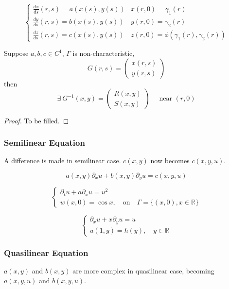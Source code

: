 $$
\left\{\begin{array}{ll}{\frac{d x}{d s}(r,s)=a(x(s), y(s))}& x(r,0)=\gamma_1(r) \\
{\frac{d y}{d s}(r,s)=b(x(s), y(s))} & y(r,0)=\gamma_2(r) \\
{\frac{d z}{d s}(r,s)=c(x(s), y(s))} & z(r,0)=\phi(\gamma_1(r), \gamma_2(r)) \end{array}\right.
$$
\begin{lemma}
Suppose $a, b, c \in C^{1}$, $\Gamma$ is non-characteristic, 
$$
G(r, s)=\left(\begin{array}{l}{x(r, s)} \\ {y(r, s)}\end{array}\right)
$$
then
$$
\exists\ G^{-1}(x, y)=\left(\begin{array}{l}{R(x, y)} \\ {S(x, y)}\end{array}\right) \quad \text { near }(r, 0)
$$
\end{lemma}
\begin{proof}
To be filled.
\end{proof}
\subsubsection{Semilinear Equation}
A difference is made in semilinear case. $c(x,y)$ now becomes $c(x,y,u)$.

\begin{equation}
a(x, y) \partial_{x} u+b(x, y) \partial_y u=c(x, y,u)
\end{equation}

\begin{example}
$$
\left\{\begin{array}{l}{\partial_{t} u+a \partial_{x}u=u^{2}} \\ {w(x, 0)=\cos x, \quad \text{on}\quad \Gamma=\{(x, 0), x \in \mathbb{R}\}}\end{array}\right.
$$
\end{example}

\begin{example}
$$
\left\{\begin{array}{l}{\partial_x u+x \partial_y u=u} \\ {u(1, y)=h(y),\quad y \in \mathbb{R}}\end{array}\right.
$$
\end{example}

\subsubsection{Quasilinear Equation}
$a(x,y)$ and $b(x,y)$ are more complex in quasilinear case, becoming $a(x,y,u)$ and $b(x,y,u)$.

